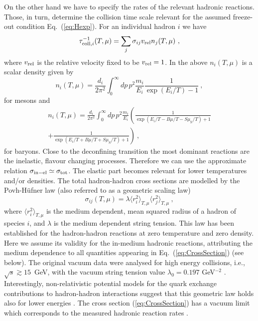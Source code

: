 \documentclass[12pt]{article}
\begin{document}
On the other hand we have to specify the rates of the relevant hadronic reactions. 
Those, in turn, determine the collision time scale relevant for the assumed freeze-out 
condition Eq.~(\ref{eq:Hexp}). 
For an individual hadron $i$ we have
%
\begin{equation}
\tau^{-1}_{\text{coll},i}(T,\mu)=\sum_{j}\sigma_{ij} v_{\rm rel} n_j(T,\mu)~,
\label{eq:}
\end{equation}
%
where $v_{\rm rel}$ is the relative velocity fixed to be $v_{\rm rel}=1$.
In the above $n_i(T,\mu)$ is a scalar density given by
%
\begin{equation}
n_{i}(T,\mu)=\frac{d_i}{2\pi^2}\int_{0}^{\infty}dp \, p^2\frac{m_i}{E_i}\frac{1}{\exp(E_i/T) - 1}~,
\label{eq:}
\end{equation}
%
for mesons and
%
\begin{eqnarray}
n_{i}(T,\mu)=\frac{d_i}{2\pi^2}\int_{0}^{\infty}dp \, p^2\frac{m_i}{E_i}\left(\frac{1}{\exp(E_i/T - B\mu/T - S\mu_{\text{S}}/T)+ 1}\right.\\
\nonumber
+\left.\frac{1}{\exp(E_i/T + B\mu/T + S\mu_{\text{S}}/T) + 1}\right)~,
\label{eq:scalarFermion}
\end{eqnarray}
%
for baryons. 
Close to the deconfining transition the most dominant reactions are the inelastic, flavour changing
processes. 
Therefore we can use the approximate relation
$\sigma_{\rm in-el}\simeq\sigma_{\rm tot}$. 
The elastic part becomes relevant for lower temperatures and/or densities.
The total hadron-hadron cross sections are modelled by the Povh-H{\"u}fner law (also referred to as a geometric scaling law) \cite{Povh:1990ad,Hufner:1992cu}
%
\begin{equation}
\sigma_{ij}(T,\mu)=\lambda\langle r_i^2\rangle_{T,\mu} \langle r_j^2 \rangle_{T,\mu}~,
\label{eq:CrossSection}
\end{equation}
%
where $\langle r_i^2\rangle_{T,\mu}$ is the medium dependent, mean squared radius of a hadron of species $i$, and $\lambda$ is the medium dependent string tension. 
This law has been established for the hadron-hadron reactions at zero temperature and zero density. 
Here we assume its validity for the in-medium hadronic reactions, attributing the medium dependence 
to all quantities appearing in Eq.~(\ref{eq:CrossSection}) (see below).
The original vacuum data were analysed for high energy collisions, i.e., $\sqrt{s}\gtrsim 15$~GeV, with 
the vacuum string tension value $\lambda_0=0.197$ GeV$^{-2}$ \cite{Hufner:1992cu}. 
Interestingly, non-relativistic potential models for the quark exchange contributions to hadron-hadron interactions suggest that this geometric law holds also for lower energies 
\cite{Martins:1994hd,Barnes:1991em}. 
The cross section (\ref{eq:CrossSection}) has a vacuum limit which corresponds to the measured hadronic reaction rates \cite{Povh:1990ad,Hufner:1992cu}.
\end{document}
